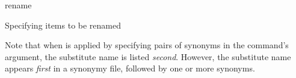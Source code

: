 \begin{command}{rename}{}
\begin{arguments}
\begin{argumentgroup}{Specifying items to be renamed}
            \begin{statement}
                Note that when  is applied by specifying pairs of
                 synonyms in the command's argument,
                the substitute name is listed \emph{second}. However,  the substitute name 
                appears \emph{first} in a synonymy file, followed by one or more synonyms.
            \end{statement}
        \end{argumentgroup}
          
    \end{arguments}
          
    \begin{poyexamples}
          
            

    \end{poyexamples}

\end{command}



           
